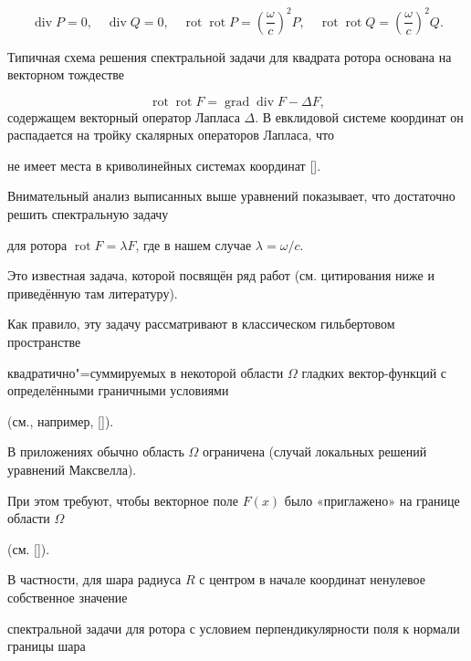 $$

\mathop{\mathrm{div}} P = 0,\quad  \mathop{\mathrm{div}} Q = 0,  \quad 

\mathop{\mathrm{rot}} \mathop{\mathrm{rot}} P = \left(\frac{\omega}{c}\right)^2 P, \quad 

\mathop{\mathrm{rot}} \mathop{\mathrm{rot}} Q = \left(\frac{\omega}{c}\right)^2 Q.

$$

Типичная схема решения спектральной задачи для квадрата ротора основана на векторном тождестве

$$\mathop{\mathrm{rot}} \mathop{\mathrm{rot}} F = \mathop{\mathrm{grad}} \mathop{\mathrm{div}} F - \Delta F,$$ содержащем векторный оператор Лапласа $\Delta$. В евклидовой системе координат он  распадается на тройку скалярных операторов Лапласа, что

не имеет места в криволинейных системах координат [].

 

 

Внимательный анализ выписанных выше уравнений показывает, что достаточно решить спектральную задачу 

для ротора $\mathop{\mathrm{rot}} F = \lambda F$, где в нашем случае $ \lambda = {\omega}/{c}$. 



Это известная задача, которой посвящён ряд работ (см. цитирования ниже и приведённую там литературу). 

Как правило, эту задачу рассматривают в классическом гильбертовом пространстве 

квадратично"=суммируемых в некоторой области $\Omega$ гладких вектор-функций с определёнными граничными условиями 

(см., например, []). 



В приложениях обычно область $\Omega$ ограничена (случай локальных решений уравнений Максвелла). 

При этом требуют, чтобы векторное поле $F(x)$ было «приглажено» на границе области $\Omega$

(см. []). 



В частности, для шара радиуса $R$ с центром в начале координат ненулевое собственное значение 

спектральной задачи для ротора  с условием перпендикулярности поля к нормали границы шара 

